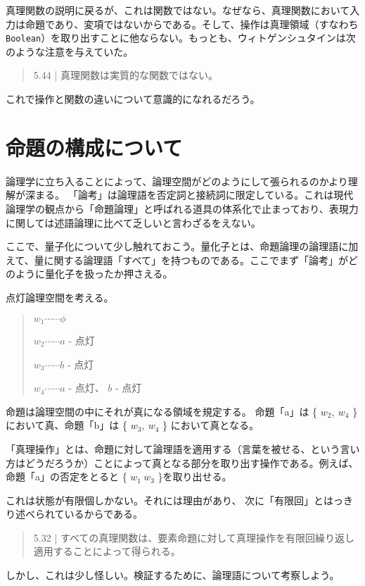 \documentclass[a4paper,onecolumn,article]{jarticle}
\newcounter{ct}               %
\begin{document}
真理関数の説明に戻るが、これは関数ではない。なぜなら、真理関数において入力は命題であり、変項ではないからである。そして、操作は真理領域（すなわち\texttt{Boolean}）を取り出すことに他ならない。もっとも、ウィトゲンシュタインは次のような注意を与えていた。

\begin{quote}
  5.44 | 真理関数は実質的な関数ではない。
\end{quote}

これで操作と関数の違いについて意識的になれるだろう。

\section{命題の構成について}

論理学に立ち入ることによって、論理空間がどのようにして張られるのかより理解が深まる。
「論考」は論理語を否定詞と接続詞に限定している。これは現代論理学の観点から「命題論理」と呼ばれる道具の体系化で止まっており、表現力に関しては述語論理に比べて乏しいと言わざるをえない。

ここで、量子化について少し触れておこう。量化子とは、命題論理の論理語に加えて、量に関する論理語「すべて」を持つものである。ここでまず「論考」がどのように量化子を扱ったか押さえる。

点灯論理空間を考える。
\begin{quote}
  $w_1 \cdots \cdots \phi$

  $w_2 \cdots \cdots a$ - 点灯

  $w_3 \cdots \cdots b$ - 点灯

  $w_4 \cdots \cdots a$ - 点灯、 $b$ - 点灯
\end{quote}

命題は論理空間の中にそれが真になる領域を規定する。
命題「a」は \{ $w_2, \  w_4$ \}において真、命題「b」は \{ $w_3, \ w_4$ \} において真となる。

「真理操作」とは、命題に対して論理語を適用する（言葉を被せる、という言い方はどうだろうか）ことによって真となる部分を取り出す操作である。例えば、命題「a」の否定をとると \{ $w_1 \ w_3$ \}を取り出せる。

これは状態が有限個しかない。それには理由があり、 次に「有限回」とはっきり述べられているからである。

\begin{quote}
  5.32 | すべての真理関数は、要素命題に対して真理操作を有限回繰り返し適用することによって得られる。
\end{quote}

しかし、これは少し怪しい。検証するために、論理語について考察しよう。
\end{document}
